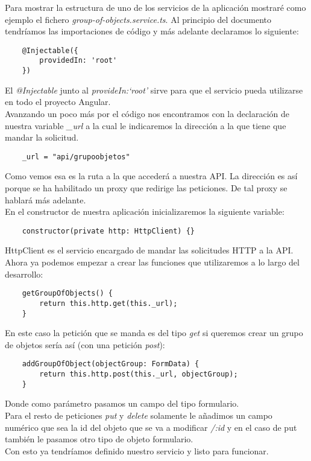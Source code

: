 Para mostrar la estructura de uno de los servicios de la aplicación mostraré como ejemplo el fichero \textit{group-of-objects.service.ts}. Al principio del documento tendríamos las importaciones de código y más adelante declaramos lo siguiente:
\begin{verbatim}
    @Injectable({
        providedIn: 'root'
    })
\end{verbatim}
El \textit{@Injectable} junto al \textit{provideIn:`root'} sirve para que el servicio pueda utilizarse en todo el proyecto Angular.
\\Avanzando un poco más por el código nos encontramos con la declaración de nuestra variable \textit{\_url} a la cual le indicaremos la dirección a la que tiene que mandar la solicitud.
\begin{verbatim}
    _url = "api/grupoobjetos"
\end{verbatim}
Como vemos esa es la ruta a la que accederá a nuestra API. La dirección es así porque se ha habilitado un proxy que redirige las peticiones. De tal proxy se hablará más adelante.
\\En el constructor de nuestra aplicación inicializaremos la siguiente variable:
\begin{verbatim}
    constructor(private http: HttpClient) {}
\end{verbatim}
HttpClient es el servicio encargado de mandar las solicitudes HTTP a la API.
\\Ahora ya podemos empezar a crear las funciones que utilizaremos a lo largo del desarrollo:
\begin{verbatim}
    getGroupOfObjects() {
        return this.http.get(this._url);
    }
\end{verbatim}
En este caso la petición que se manda es del tipo \textit{get} si queremos crear un grupo de objetos sería así (con una petición \textit{post}):
\begin{verbatim}
    addGroupOfObject(objectGroup: FormData) {
        return this.http.post(this._url, objectGroup);
    }
\end{verbatim}
Donde como parámetro pasamos un campo del tipo formulario.
\\Para el resto de peticiones \textit{put} y \textit{delete} solamente le añadimos un campo numérico que sea la id del objeto que se va a modificar \textit{/:id} y en el caso de put también le pasamos otro tipo de objeto formulario.
\\Con esto ya tendríamos definido nuestro servicio y listo para funcionar.


